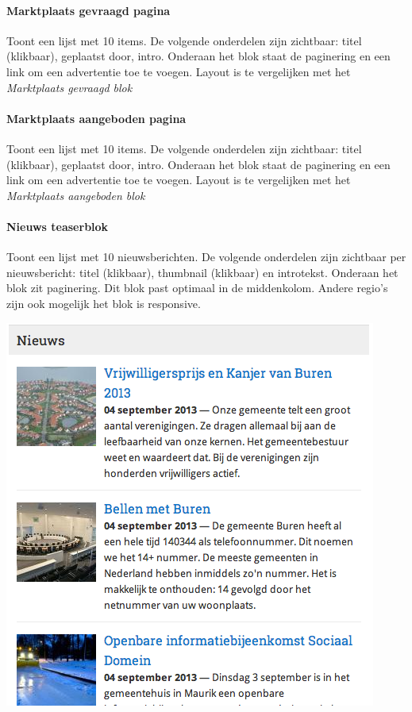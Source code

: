 \paragraph{Marktplaats gevraagd pagina}

Toont een lijst met 10 items. De volgende onderdelen zijn zichtbaar: titel (klikbaar), geplaatst door, intro. Onderaan het blok staat de paginering en een link om een advertentie toe te voegen. Layout is te vergelijken met het \emph{Marktplaats gevraagd blok}

\paragraph{Marktplaats aangeboden pagina}

Toont een lijst met 10 items. De volgende onderdelen zijn zichtbaar: titel (klikbaar), geplaatst door, intro. Onderaan het blok staat de paginering en een link om een advertentie toe te voegen. Layout is te vergelijken met het \emph{Marktplaats aangeboden blok}

\paragraph{Nieuws teaserblok}

Toont een lijst met 10 nieuwsberichten. De volgende onderdelen zijn zichtbaar per nieuwsbericht: titel (klikbaar), thumbnail (klikbaar) en introtekst. Onderaan het blok zit paginering. Dit blok past optimaal in de middenkolom. Andere regio's zijn ook mogelijk het blok is responsive.

\begin{center}
	\includegraphics[scale=0.5]{img/blokken/nieuwsteaser.png}
\end{center}

